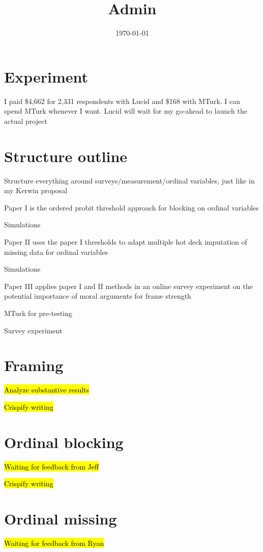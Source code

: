 \documentclass[12pt]{article}
\title{Admin}
\date{\today}
\begin{document}
\maketitle


\section*{Experiment}
	\begin{coi}
		\item I paid \$4,662 for 2,331 respondents with Lucid and \$168 with MTurk. I can spend MTurk whenever I want. Lucid will wait for my go-ahead to launch the actual project
	\end{coi}	
	
\section*{Structure outline}
	\begin{coi}
		\item Structure everything around surveys/measurement/ordinal variables, just like in my Kerwin proposal
		\item Paper I is the ordered probit threshold approach for blocking on ordinal variables
			\begin{coi}
				\item Simulations
			\end{coi}
		\item Paper II uses the paper I thresholds to adapt multiple hot deck imputation of missing data for ordinal variables
			\begin{coi}
				\item Simulations
			\end{coi}
		\item Paper III applies paper I and II methods in an online survey experiment on the potential importance of moral arguments for frame strength
			\begin{coi}
				\item MTurk for pre-testing
				\item Survey experiment
			\end{coi}
	\end{coi}


\section*{Framing}
	\begin{coi}
		\item \hl{Analyze substantive results}
		\item \hl{Crispify writing}
	\end{coi} 

\section*{Ordinal blocking}
	\begin{coi}
		\item \hl{Waiting for feedback from Jeff}
		\item \hl{Crispify writing}
	\end{coi}
	
\section*{Ordinal missing}
	\begin{coi}
		\item \hl{Waiting for feedback from Ryan}
	\end{coi}
	

	
\end{document}
